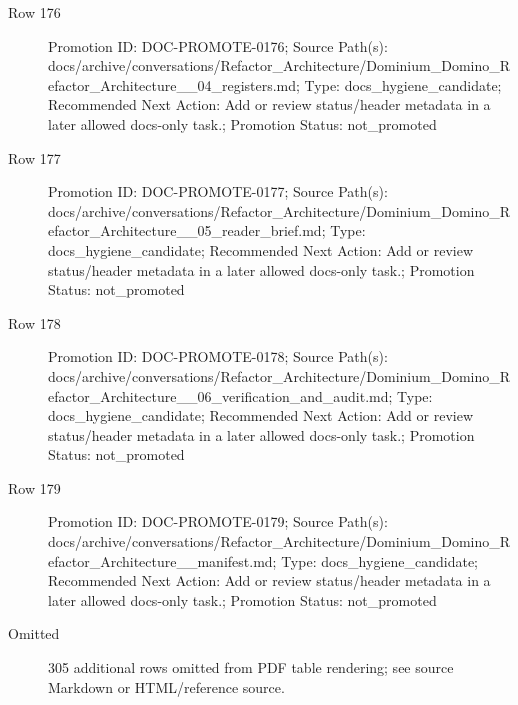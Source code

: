 \documentclass[9pt,a4paper,openany]{book}
\begin{document}
\begin{description}
\item[Row 176] Promotion ID: DOC-\allowbreak{}PROMOTE-\allowbreak{}0176; Source Path(s): docs/\allowbreak{}archive/\allowbreak{}conversations/\allowbreak{}Refactor\_\allowbreak{}Architecture/\allowbreak{}Dominium\_\allowbreak{}Domino\_\allowbreak{}Refactor\_\allowbreak{}Architecture\_\allowbreak{}\_\allowbreak{}04\_\allowbreak{}registers.\allowbreak{}md; Type: docs\_\allowbreak{}hygiene\_\allowbreak{}candidate; Recommended Next Action: Add or review status/\allowbreak{}header metadata in a later allowed docs-\allowbreak{}only task.\allowbreak{}; Promotion Status: not\_\allowbreak{}promoted
\item[Row 177] Promotion ID: DOC-\allowbreak{}PROMOTE-\allowbreak{}0177; Source Path(s): docs/\allowbreak{}archive/\allowbreak{}conversations/\allowbreak{}Refactor\_\allowbreak{}Architecture/\allowbreak{}Dominium\_\allowbreak{}Domino\_\allowbreak{}Refactor\_\allowbreak{}Architecture\_\allowbreak{}\_\allowbreak{}05\_\allowbreak{}reader\_\allowbreak{}brief.\allowbreak{}md; Type: docs\_\allowbreak{}hygiene\_\allowbreak{}candidate; Recommended Next Action: Add or review status/\allowbreak{}header metadata in a later allowed docs-\allowbreak{}only task.\allowbreak{}; Promotion Status: not\_\allowbreak{}promoted
\item[Row 178] Promotion ID: DOC-\allowbreak{}PROMOTE-\allowbreak{}0178; Source Path(s): docs/\allowbreak{}archive/\allowbreak{}conversations/\allowbreak{}Refactor\_\allowbreak{}Architecture/\allowbreak{}Dominium\_\allowbreak{}Domino\_\allowbreak{}Refactor\_\allowbreak{}Architecture\_\allowbreak{}\_\allowbreak{}06\_\allowbreak{}verification\_\allowbreak{}and\_\allowbreak{}audit.\allowbreak{}md; Type: docs\_\allowbreak{}hygiene\_\allowbreak{}candidate; Recommended Next Action: Add or review status/\allowbreak{}header metadata in a later allowed docs-\allowbreak{}only task.\allowbreak{}; Promotion Status: not\_\allowbreak{}promoted
\item[Row 179] Promotion ID: DOC-\allowbreak{}PROMOTE-\allowbreak{}0179; Source Path(s): docs/\allowbreak{}archive/\allowbreak{}conversations/\allowbreak{}Refactor\_\allowbreak{}Architecture/\allowbreak{}Dominium\_\allowbreak{}Domino\_\allowbreak{}Refactor\_\allowbreak{}Architecture\_\allowbreak{}\_\allowbreak{}manifest.\allowbreak{}md; Type: docs\_\allowbreak{}hygiene\_\allowbreak{}candidate; Recommended Next Action: Add or review status/\allowbreak{}header metadata in a later allowed docs-\allowbreak{}only task.\allowbreak{}; Promotion Status: not\_\allowbreak{}promoted
\item[Omitted] 305 additional rows omitted from PDF table rendering; see source Markdown or HTML/\allowbreak{}reference source.\allowbreak{}
\end{description}
\end{document}
